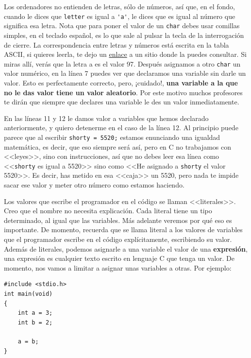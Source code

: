 \documentclass[a4paper]{article}
\begin{document}
Los ordenadores no entienden de letras, sólo de números, así que, en el fondo,
cuando le dices que \verb!letter! es igual a \verb!'a'!, le dices que es igual
al número que significa esa letra. Nota que para poner el valor de un
\texttt{char} debes usar comillas simples, en el teclado español, es lo que
sale al pulsar la tecla de la interrogación de cierre.
La correspondencia entre letras y números está escrita en la tabla ASCII, si
quieres leerla, te dejo un \href{https://elcodigoascii.com.ar/}{enlace}
a un sitio donde la puedes consultar.
Si miras allí, verás que la letra a es el valor
97. Después asignamos a otro \verb!char!
un valor numérico, en la línea 7 puedes ver que declaramos una variable sin
darle un valor. Esto es perfectamente correcto, pero, ¡cuidado!,
\textbf{una variable a la que no le das valor tiene un valor aleatorio}.
Por este motivo muchos profesores te dirán que siempre que declares
una variable le des un valor inmediatamente.

En las líneas 11 y 12 le damos
valor a variables que hemos declarado anteriormente, y quiero detenerme en el
caso de la línea 12. Al principio puede parece que al escribir
\verb!shorty = 5520;! estamos enunciando una igualdad matemática, es decir,
que eso siempre será así, pero en C no trabajamos con <<leyes>>, sino con
instrucciones, así que no debes leer esa línea como <<\verb!shorty! es igual a
5520>> sino como <<He asignado a \verb!shorty! el valor 5520>>. Es decir, has
metido en esa <<caja>> un 5520, pero nada te impide sacar ese valor y meter
otro número como estamos haciendo.

Los valores que escribe el programador en el código se llaman <<literales>>.
Creo que el nombre no necesita explicación. Cada literal tiene un tipo
determinado, al igual que las variables. Más adelante veremos por qué eso es
importante. De momento, recuerda que se llama literal a los valores de
variables que el programador escribe en el código explícitamente, escribiendo
su valor.
Además de literales, podemos asignarle a una
variable el valor de una \textbf{expresión}, una expresión es cualquier
texto escrito en lenguaje C que tenga un valor. De momento, nos vamos a limitar
a asignar unas variables a otras. Por ejemplo:

\noindent
\begin{minipage}[H]{\linewidth}
\mbox{}
\begin{lstlisting}[style=C, caption={Asignación de variables entre ellas},
label={lst:variableAsignationBetween}]
#include <stdio.h>
int main(void)
{
    int a = 3;
    int b = 2;

    a = b;
}
\end{lstlisting}
\end{minipage}
\end{document}
